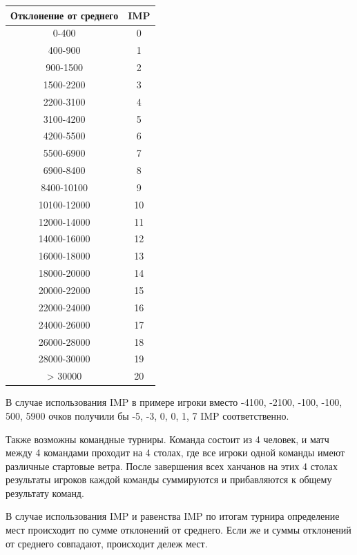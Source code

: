 \begin{tabular}{|c|c|}
	\hline
	Отклонение от среднего & IMP \\
	\hline
	0-400 & 0 \\
	\hline
	400-900 & 1 \\
	\hline
	900-1500 & 2 \\
	\hline
	1500-2200 & 3 \\
	\hline
	2200-3100 & 4 \\
	\hline
	3100-4200 & 5 \\
	\hline
	4200-5500 & 6 \\
	\hline
	5500-6900 & 7 \\
	\hline
	6900-8400 & 8 \\
	\hline
	8400-10100 & 9 \\
	\hline
	10100-12000 & 10 \\
	\hline
	12000-14000 & 11 \\
	\hline
	14000-16000 & 12 \\
	\hline
	16000-18000 & 13 \\
	\hline
	18000-20000 & 14 \\
	\hline
	20000-22000 & 15 \\
	\hline
	22000-24000 & 16 \\
	\hline
	24000-26000 & 17 \\
	\hline
	26000-28000 & 18 \\
	\hline
	28000-30000 & 19 \\
	\hline
	> 30000 & 20 \\
	\hline
\end{tabular}

\vspace{0.3cm}

В случае использования IMP в примере игроки вместо -4100, -2100, -100, -100, 500, 5900 очков получили бы -5, -3, 0, 0, 1, 7 IMP соответственно.

\vspace{0.3cm}

Также возможны командные турниры. Команда состоит из 4 человек, и матч между 4 командами проходит на 4 столах, где все игроки одной команды имеют различные стартовые ветра. После завершения всех ханчанов на этих 4 столах результаты игроков каждой команды суммируются и прибавляются к общему результату команд.

\vspace{0.3cm}

В случае использования IMP и равенства IMP по итогам турнира определение мест происходит по сумме отклонений от среднего. Если же и суммы отклонений от среднего совпадают, происходит дележ мест.

